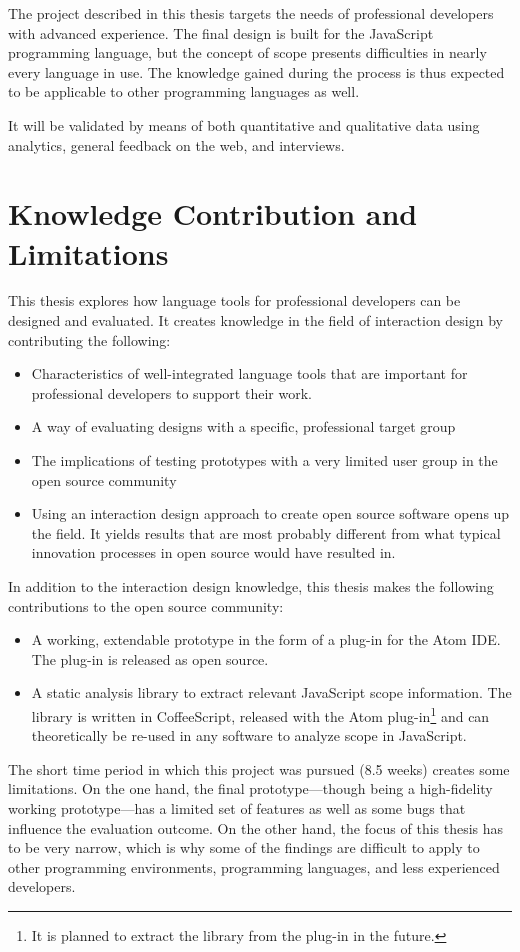 The project described in this thesis targets the needs of professional
developers with advanced experience. The final design is built for the
JavaScript programming language, but the concept of scope presents
difficulties in nearly every language in use. The knowledge gained
during the process is thus expected to be applicable to other
programming languages as well.

It will be validated by means of both quantitative and qualitative data
using analytics, general feedback on the web, and interviews.

\section{Knowledge Contribution and
Limitations}\label{knowledge-contribution-and-limitations}

This thesis explores how language tools for professional developers can
be designed and evaluated. It creates knowledge in the field of
interaction design by contributing the following:

\begin{itemize}
\itemsep1pt\parskip0pt
\item
  Characteristics of well-integrated language tools that are important
  for professional developers to support their work.
\item
  A way of evaluating designs with a specific, professional target group
\item
  The implications of testing prototypes with a very limited user group
  in the open source community
\item
  Using an interaction design approach to create open source software
  opens up the field. It yields results that are most probably different
  from what typical innovation processes in open source would have
  resulted in.
\end{itemize}

In addition to the interaction design knowledge, this thesis makes the
following contributions to the open source community:

\begin{itemize}
\itemsep1pt\parskip0pt
\item
  A working, extendable prototype in the form of a plug-in for the Atom
  IDE. The plug-in is released as open source.
\item
  A static analysis library to extract relevant JavaScript scope
  information. The library is written in CoffeeScript, released with the
  Atom
  plug-in\footnote{It is planned to extract the library from the plug-in in the future.}
  and can theoretically be re-used in any software to analyze scope in
  JavaScript.
\end{itemize}

The short time period in which this project was pursued (8.5 weeks)
creates some limitations. On the one hand, the final prototype—though
being a high-fidelity working prototype—has a limited set of features as
well as some bugs that influence the evaluation outcome. On the other
hand, the focus of this thesis has to be very narrow, which is why some
of the findings are difficult to apply to other programming
environments, programming languages, and less experienced developers.
